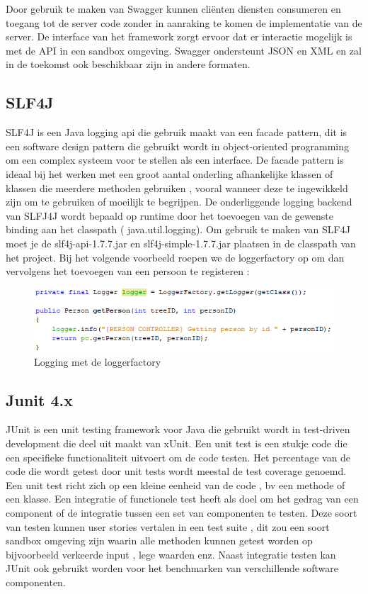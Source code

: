 \documentclass[pdftex,a4paper,12pt,twoside]{report}
\begin{document}
Door gebruik te maken van Swagger kunnen cliënten diensten consumeren en toegang tot de server code zonder in aanraking te komen de implementatie van de server.
De interface van het framework zorgt ervoor dat er interactie mogelijk is  met de API in een sandbox omgeving.
Swagger ondersteunt JSON en XML en zal in de toekomst ook beschikbaar zijn in andere formaten.

\subsection{SLF4J}
SLF4J is een Java logging api die gebruik maakt van een facade pattern, dit is een software design pattern die gebruikt wordt in object-oriented programming om een complex systeem voor te stellen als een interface.
De facade pattern is ideaal bij het werken met een groot aantal onderling afhankelijke klassen of klassen die meerdere methoden gebruiken , vooral wanneer deze te ingewikkeld zijn om te gebruiken of moeilijk te begrijpen.
De onderliggende logging backend van SLFJ4J wordt bepaald op runtime door het toevoegen van de gewenste binding aan het classpath ( java.util.logging).
Om gebruik te maken van SLF4J moet je de slf4j-api-1.7.7.jar en slf4j-simple-1.7.7.jar plaatsen in de classpath van het project.
Bij het volgende voorbeeld roepen we de loggerfactory op om dan vervolgens het toevoegen van een persoon te registeren :
\begin{figure}[!htb]
\includegraphics{images/logger.png}
\caption{Logging met de loggerfactory}
\end{figure}


\subsection{Junit 4.x}
JUnit is een unit testing framework voor Java die gebruikt wordt in test-driven development die deel uit maakt van xUnit.
Een unit test is een stukje code die een specifieke functionaliteit uitvoert om de code testen. Het percentage van de code die wordt getest door unit tests wordt meestal de test coverage genoemd.
Een unit test richt zich op een kleine eenheid van de code , bv een methode of een klasse.
Een integratie of functionele test heeft als doel om het gedrag van een component of de integratie tussen een set van componenten te testen.
Deze soort van testen kunnen user stories vertalen in een test suite , dit zou een soort sandbox omgeving zijn waarin alle methoden kunnen getest worden op bijvoorbeeld verkeerde input , lege waarden enz.
Naast integratie testen kan JUnit ook gebruikt worden voor het benchmarken van verschillende software componenten.
\end{document}
